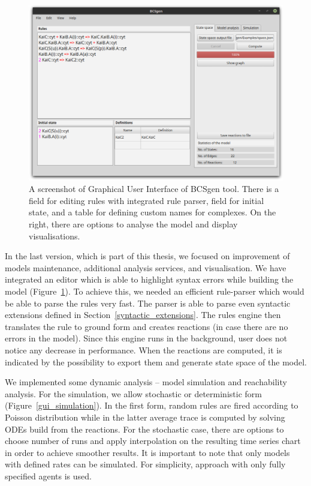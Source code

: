 \documentclass[12pt, twoside]{fithesis2} %
\begin{document}
\begin{figure}[!h]
\begin{center}
\includegraphics[scale=0.35]{pics/BCSgen_gui}
\caption{A screenshot of Graphical User Interface of BCSgen tool. There is a field for editing rules with integrated rule parser, field for initial state, and a table for defining custom names for complexes. On the right, there are options to analyse the model and display visualisations.}\label{gui_example}
\end{center}
\end{figure}

In the last version, which is part of this thesis, we focused on improvement of models maintenance, additional analysis services, and visualisation. We have integrated an editor which is able to highlight syntax errors while building the model (Figure~\ref{gui_example}). To achieve this, we needed an efficient rule-parser which would be able to parse the rules very fast. The parser is able to parse even syntactic extensions defined in Section~\ref{syntactic_extensions}. The rules engine then translates the rule to ground form and creates reactions (in case there are no errors in the model). Since this engine runs in the background, user does not notice any decrease in performance. When the reactions are computed, it is indicated by the possibility to export them and generate state space of the model.

We implemented some dynamic analysis -- model simulation and reachability analysis. For the simulation, we allow stochastic or deterministic form (Figure~\ref{gui_simulation}). In the first form, random rules are fired according to Poisson distribution while in the latter average trace is computed by solving ODEs build from the reactions. For the stochastic case, there are options to choose number of runs and apply interpolation on the resulting time series chart in order to achieve smoother results. It is important to note that only models with defined rates can be simulated. For simplicity, approach with only fully specified agents is used.
\end{document}

